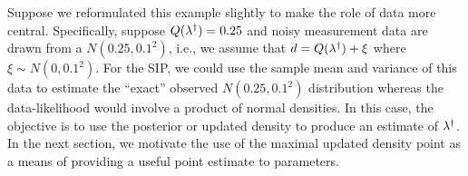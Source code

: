 Suppose we reformulated this example slightly to make the role of data more central.
Specifically, suppose $Q(\lambda^\dagger)=0.25$ and noisy measurement data are drawn from a $N(0.25,0.1^2)$, i.e., we assume that $d=Q(\lambda^\dagger)+\xi$ where $\xi\sim N(0,0.1^2)$.
For the SIP, we could use the sample mean and variance of this data to estimate the ``exact'' observed $N(0.25,0.1^2)$ distribution whereas the data-likelihood would involve a product of normal densities.
In this case, the objective is to use the posterior or updated density to produce an estimate of $\lambda^\dagger$.
In the next section, we motivate the use of the maximal updated density point as a means of providing a useful point estimate to parameters.







